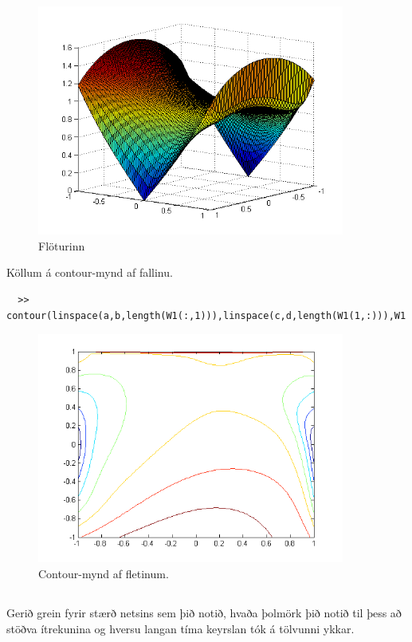 \documentclass[11pt,a4paper,titlepage]{article}
\begin{document}
  \begin{figure}[h!]
      \centering
      \includegraphics[width=0.9\textwidth]{lagmarksflotur.png}
      \caption{Flöturinn}
      \label{fig:awesome_image13}
  \end{figure}
  Köllum á contour-mynd af fallinu.
  \begin{verbatim}
  >> contour(linspace(a,b,length(W1(:,1))),linspace(c,d,length(W1(1,:))),W1');
  \end{verbatim}

    \begin{figure}[h!]
        \centering
        \includegraphics[width=0.9\textwidth]{lagmarksflotur_contour.png}
        \caption{Contour-mynd af fletinum.}
        \label{fig:awesome_image13}
    \end{figure}
\newpage

\subsection{}
Gerið grein fyrir stærð netsins sem þið notið, hvaða þolmörk þið notið til þess að stöðva ítrekunina og hversu langan tíma keyrslan tók á tölvunni ykkar.
\end{document}
